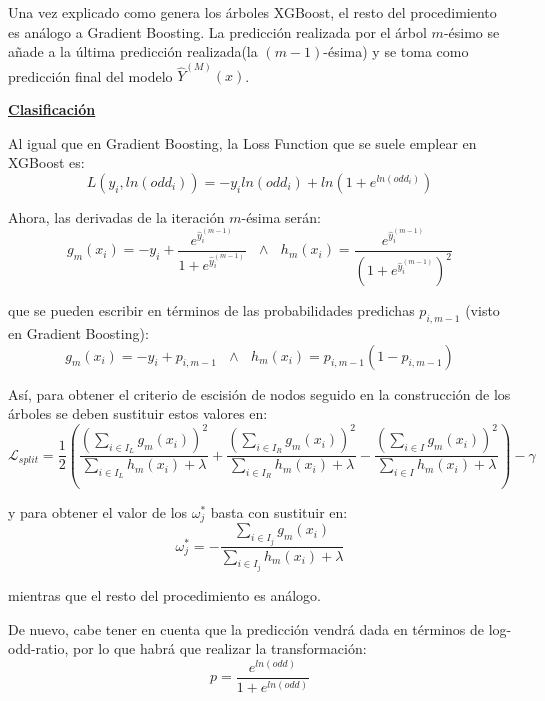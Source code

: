 \documentclass[12pt,twoside]{article}
\begin{document}
Una vez explicado como genera los árboles XGBoost, el resto del procedimiento es análogo a Gradient Boosting. La predicción realizada por el árbol $m$-ésimo se añade a la última predicción realizada(la $(m-1)$-ésima) y se toma como predicción final del modelo $\hat{Y}^{(M)}(x)$.



\bigskip

\textbf{\underline{Clasificación}}

Al igual que en Gradient Boosting, la Loss Function que se suele emplear en XGBoost es:
\begin{equation*}
L(y_i, ln(odd_i)) = -y_i ln(odd_i) + ln \left( 1 + e^{ln(odd_i)} \right)
\end{equation*}

Ahora, las derivadas de la iteración $m$-ésima serán:
\begin{equation*}
g_m(x_i) = -y_i + \frac{e^{\hat{y}_i^{(m-1)}}}{1 + e^{\hat{y}_i^{(m-1)}}} \, \, \, \, \wedge \, \, \, \, h_m(x_i) = \frac{e^{\hat{y}_i^{(m-1)}}}{(1 + e^{\hat{y}_i^{(m-1)}})^2}
\end{equation*}

\noindent
que se pueden escribir en términos de las probabilidades predichas $p_{i, m-1}$ (visto en Gradient Boosting):
\begin{equation*}
g_m(x_i) = -y_i + p_{i, m-1} \, \, \, \, \wedge \, \, \, \, h_m(x_i) = p_{i, m-1}(1 - p_{i, m-1})
\end{equation*}

Así, para obtener el criterio de escisión de nodos seguido en la construcción de los árboles se deben sustituir estos valores en:
\begin{equation*}
\mathcal{L}_{split} = \frac{1}{2} \left( \frac{\left( \sum_{i \in I_L} g_m(x_i) \right)^2}{\sum_{i \in I_L} h_m(x_i) + \lambda} + \frac{\left( \sum_{i \in I_R} g_m(x_i) \right)^2}{\sum_{i \in I_R} h_m(x_i) + \lambda} - \frac{\left( \sum_{i \in I} g_m(x_i) \right)^2}{\sum_{i \in I} h_m(x_i) + \lambda} \right)   - \gamma 
\end{equation*}

\noindent
y para obtener el valor de los $\omega_j^*$ basta con sustituir en:
\begin{equation*}
\omega_j^* = - \frac{\sum_{i \in I_j} g_m(x_i)}{\sum_{i \in I_j} h_m(x_i) + \lambda}
\end{equation*}

\noindent
mientras que el resto del procedimiento es análogo.

De nuevo, cabe tener en cuenta que la predicción vendrá dada en términos de log-odd-ratio, por lo que habrá que realizar la transformación:
\begin{equation*}
p = \frac{e^{ln(odd)}}{1 + e^{ln(odd)}}
\end{equation*}
\end{document}

